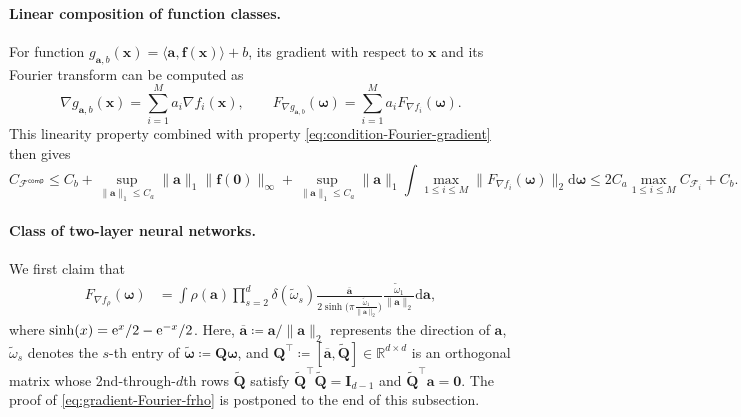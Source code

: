 \documentclass[english]{article}
\begin{document}
\paragraph{Linear composition of function classes.}
For function $g_{\bm{a},b}(\bm{x}) = \langle {\bm a}, {\bm f}({\bm x}) \rangle + b$, its gradient with respect to ${\bm x}$ and its Fourier transform can be computed as
$$
\nabla g_{\bm{a},b}({\bm x}) = \sum_{i=1}^M a_i\nabla f_i({\bm x}),\qquad F_{\nabla g_{\bm{a},b}}({\bm \omega}) = \sum_{i=1}^M a_iF_{\nabla f_i}({\bm \omega}). 
$$
This linearity property combined with property \eqref{eq:condition-Fourier-gradient} then gives
$$
C_{\mathcal{F}^{\mathsf{comp}}}\le C_b + \sup_{\|{\bm a}\|_1\le C_a} \|{\bm a}\|_1\|{\bm f}({\bm 0})\|_{\infty} +  \sup_{\|{\bm a}\|_1\le C_a} \|{\bm a}\|_1\int \max_{1\leq i\leq M}\|F_{\nabla f_i}({\bm \omega})\|_2 \mathrm{d} {\bm\omega}\le 2C_a\max_{1\leq i\leq M} C_{\mathcal{F}_i} + C_b.
$$

\paragraph{Class of two-layer neural networks.}
We first claim that
\begin{align}\label{eq:gradient-Fourier-frho}
F_{\nabla f_{\rho}}({\bm \omega}) &=\int \rho({\bm a})\prod_{s=2}^d\delta(\widetilde{\omega}_s)\frac{\overline{\bm a}}{2\sinh\big(\pi\frac{\widetilde{\omega}_1}{\|{\bm a}\|_2}\big)}\frac{\widetilde{\omega}_1}{\|{\bm a}\|_2} \mathrm{d} {\bm a},
\end{align}
%
where $\sinh(x) = {\rm e}^x/2 - {\rm e}^{-x}/2$. 
Here,  $\overline{\bm a} \coloneqq {\bm a}/\|{\bm a}\|_2$ represents the direction of ${\bm a}$, $\widetilde{\omega}_s$ denotes the $s$-th entry of $\widetilde{\bm \omega} \coloneqq {\bm Q}{\bm \omega}$, and ${\bm Q}^{\top} \coloneqq [\overline{\bm a},\widetilde{\bm Q}]\in\mathbb{R}^{d\times d}$ is an orthogonal matrix whose 2nd-through-$d$th rows
$\widetilde{\bm Q}$ satisfy $\widetilde{\bm Q}^{\top}\widetilde{\bm Q} = {\bm I}_{d-1}$ and $\widetilde{\bm Q}^{\top}{\bm a} = {\bm 0}$.
The proof of \eqref{eq:gradient-Fourier-frho} is postponed to the end of this subsection. 
\end{document}
